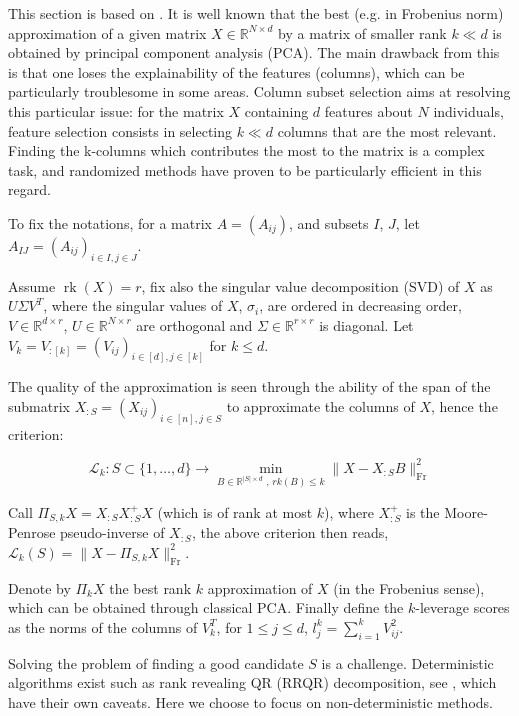 


This section is based on \cite{belhadji_determinantal_2020}.
It is well known that the best (e.g. in Frobenius norm) approximation of a given matrix $X \in \mathbb{R}^{N \times  d}$ by a matrix of smaller rank $k \ll d$ is obtained by principal component analysis (PCA). The main drawback from this is that one loses the explainability of the features (columns), which can be particularly troublesome in some areas. Column subset selection aims at resolving this particular issue: for the matrix $X$ containing $d$ features about $N$ individuals, feature selection consists in selecting $k \ll d$ columns that are the most relevant. Finding the k-columns which contributes the most to the matrix is a complex task, and randomized methods have proven to be particularly efficient in this regard.

To fix the notations, for a matrix $A = (A_{ij})$, and subsets $I$, $J$, let $A_{IJ} = (A_{ij})_{i \in I, j \in J}$. 

Assume $\operatorname{rk}(X) = r$, fix also the singular value decomposition (SVD) of $X$ as $U \Sigma V^T$, where the singular values of $X$, $\sigma_i$, are ordered in decreasing order, $V \in \mathbb{R}^{d  \times r}$, $U \in \mathbb{R}^{N  \times r}$ are orthogonal and $\Sigma \in \mathbb{R}^{r  \times r}$ is diagonal. Let $V_k = V_{:[k]} = (V_{ij})_{i \in [d], j \in [k]}$ for $k\leq d$.

The quality of the approximation is seen through the ability of the span of the submatrix $X_{:S} = (X_{ij})_{i \in [n], j \in S}$ to approximate the columns of $X$, hence the criterion:

\[ \mathcal{L}_{k} : S  \subset  \{1, \dots, d\} \rightarrow  \underset{B \in \mathbb{R}^{\lvert S \rvert \times d} \text{ , } rk(B) \leq k}{\operatorname{min}} \lVert X - X_{:S} B \rVert_{\operatorname{Fr}}^2 \]

Call $\Pi_{S,k}X = X_{:S} X_{:S}^+ X $ (which is of rank at most $k$), where $X_{:S}^+$ is the Moore-Penrose pseudo-inverse of $X_{:S}$, the above criterion then reads, $\mathcal{L}_{k}(S) = \lVert X - \Pi_{S,k}X  \rVert_{\operatorname{Fr}}^2 $. 

Denote by $\Pi_k X$ the best rank $k$ approximation of $X$ (in the Frobenius sense), which can be obtained through classical PCA. Finally define the $k$-leverage scores as the norms of the columns of $V_k^T$, for $1\leq j \leq d$, $l_j^k = \sum \limits_{i = 1}^k V_{ij}^2$.

Solving the problem of finding a good candidate $S$ is a challenge. Deterministic algorithms exist such as rank revealing QR (RRQR) decomposition, see \cite{boutsidis_improved_nodate}, which have their own caveats. Here we choose to focus on non-deterministic methods.

